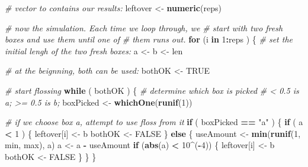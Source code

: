 \documentclass[]{book}
\makeatletter
\newenvironment{Shaded}{\begin{snugshade}}{\end{snugshade}}
\newcommand{\KeywordTok}[1]{\textcolor[rgb]{0.13,0.29,0.53}{\textbf{#1}}}
\newcommand{\DecValTok}[1]{\textcolor[rgb]{0.00,0.00,0.81}{#1}}
\newcommand{\StringTok}[1]{\textcolor[rgb]{0.31,0.60,0.02}{#1}}
\newcommand{\CommentTok}[1]{\textcolor[rgb]{0.56,0.35,0.01}{\textit{#1}}}
\newcommand{\OtherTok}[1]{\textcolor[rgb]{0.56,0.35,0.01}{#1}}
\newcommand{\ControlFlowTok}[1]{\textcolor[rgb]{0.13,0.29,0.53}{\textbf{#1}}}
\newcommand{\OperatorTok}[1]{\textcolor[rgb]{0.81,0.36,0.00}{\textbf{#1}}}
\newcommand{\NormalTok}[1]{#1}
\newenvironment{kframe}{%
\medskip{}
\setlength{\fboxsep}{.8em}
 \def\at@end@of@kframe{}%
 \ifinner\ifhmode%
  \def\at@end@of@kframe{\end{minipage}}%
  \begin{minipage}{\columnwidth}%
 \fi\fi%
 \def\FrameCommand##1{\hskip\@totalleftmargin \hskip-\fboxsep
 \colorbox{shadecolor}{##1}\hskip-\fboxsep
     \hskip-\linewidth \hskip-\@totalleftmargin \hskip\columnwidth}%
 \MakeFramed {\advance\hsize-\width
   \@totalleftmargin\z@ \linewidth\hsize
   \@setminipage}}%
 {\par\unskip\endMakeFramed%
 \at@end@of@kframe}
\renewenvironment{Shaded}{\begin{kframe}}{\end{kframe}}
\theoremstyle{definition}
\theoremstyle{definition}
\theoremstyle{definition}
\theoremstyle{remark}
\makeatother
\begin{document}
{\begin{Shaded}
\begin{Highlighting}[]
  \CommentTok{# vector to contains our results:}
\NormalTok{  leftover <-}\StringTok{ }\KeywordTok{numeric}\NormalTok{(reps)}
  
  \CommentTok{# now the simulation.  Each time we loop through, we}
  \CommentTok{# start with two fresh boxes and use them until one of}
  \CommentTok{# them runs out.}
  \ControlFlowTok{for}\NormalTok{ (i }\ControlFlowTok{in} \DecValTok{1}\OperatorTok{:}\NormalTok{reps ) \{}
    \CommentTok{# set the initial lengh of the two fresh boxes:}
\NormalTok{    a <-}\StringTok{ }\NormalTok{b <-}\StringTok{ }\NormalTok{len}
    
    \CommentTok{# at the beignning, both can be used:}
\NormalTok{    bothOK <-}\StringTok{ }\OtherTok{TRUE}
    
    \CommentTok{# start flossing}
    \ControlFlowTok{while}\NormalTok{ ( bothOK ) \{}
      \CommentTok{# determine which box is picked}
      \CommentTok{# < 0.5 is a; >= 0.5 is b;}
\NormalTok{      boxPicked <-}\StringTok{ }\KeywordTok{whichOne}\NormalTok{(}\KeywordTok{runif}\NormalTok{(}\DecValTok{1}\NormalTok{))}
      
      \CommentTok{# if we choose box a, attempt to use floss from it}
      \ControlFlowTok{if}\NormalTok{ ( boxPicked }\OperatorTok{==}\StringTok{ "a"}\NormalTok{ ) \{}
        \ControlFlowTok{if}\NormalTok{ ( a }\OperatorTok{<}\StringTok{ }\DecValTok{1}\NormalTok{ ) \{}
\NormalTok{          leftover[i] <-}\StringTok{ }\NormalTok{b}
\NormalTok{          bothOK <-}\StringTok{ }\OtherTok{FALSE}
\NormalTok{        \} }\ControlFlowTok{else}\NormalTok{ \{}
\NormalTok{          useAmount <-}\StringTok{ }\KeywordTok{min}\NormalTok{(}\KeywordTok{runif}\NormalTok{(}\DecValTok{1}\NormalTok{, min, max), a)}
\NormalTok{          a <-}\StringTok{ }\NormalTok{a }\OperatorTok{-}\StringTok{ }\NormalTok{useAmount}
          \ControlFlowTok{if}\NormalTok{ (}\KeywordTok{abs}\NormalTok{(a) }\OperatorTok{<}\StringTok{ }\DecValTok{10}\OperatorTok{^}\NormalTok{(}\OperatorTok{-}\DecValTok{4}\NormalTok{)) \{}
\NormalTok{            leftover[i] <-}\StringTok{ }\NormalTok{b}
\NormalTok{            bothOK <-}\StringTok{ }\OtherTok{FALSE}
\NormalTok{          \}}
\NormalTok{        \}}
\NormalTok{      \}}
      

\end{Highlighting}
\end{Shaded}}
\end{document}
